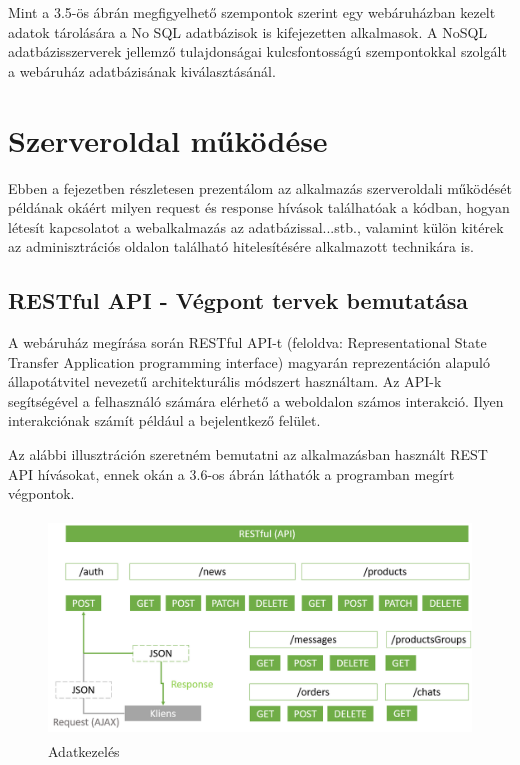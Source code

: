 Mint a 3.5-ös ábrán megfigyelhető szempontok szerint egy webáruházban kezelt adatok tárolására a No SQL adatbázisok is kifejezetten alkalmasok. A NoSQL adatbázisszerverek jellemző tulajdonságai kulcsfontosságú szempontokkal szolgált a webáruház adatbázisának kiválasztásánál.

\section{Szerveroldal működése}

Ebben a fejezetben részletesen prezentálom az alkalmazás szerveroldali működését példának okáért milyen request és response hívások találhatóak a kódban, hogyan létesít kapcsolatot a webalkalmazás az adatbázissal...stb., valamint külön kitérek az adminisztrációs oldalon található hitelesítésére alkalmazott technikára is.

\subsection{RESTful API - Végpont tervek bemutatása}

A webáruház megírása során RESTful API-t (feloldva: Representational State Transfer Application programming interface) magyarán reprezentáción alapuló állapotátvitel nevezetű architekturális módszert használtam. Az API-k segítségével a felhasználó számára elérhető a weboldalon számos interakció. Ilyen interakciónak számít például a bejelentkező felület.

\bigskip
Az alábbi illusztráción szeretném bemutatni az alkalmazásban használt REST API hívásokat, ennek okán a 3.6-os ábrán láthatók a programban megírt végpontok.


\begin{figure}[H]
	\centering
	\includegraphics[width=1.0\textwidth,height=220px]{images/restapi_bemutatasa.png}
	\caption{Adatkezelés}
	\label{fig.picture-8}
\end{figure}

